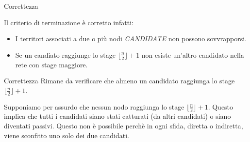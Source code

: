 \begin{frame}{Correttezza}

Il criterio di terminazione è corretto infatti:

\begin{itemize}
\setlength\itemsep{2em}
 \item I territori associati a due o più nodi \textit{CANDIDATE} non possono sovvrapporsi.
 \item Se un candiato raggiunge lo stage $\lfloor\frac{n}{2}\rfloor+1$ non esiste un'altro candidato nella rete con stage maggiore.
\end{itemize}

\end{frame}

\begin{frame}{Correttezza}
 Rimane da verificare che almeno un candidato raggiunga lo stage $\lfloor\frac{n}{2}\rfloor+1$. 

 Supponiamo per assurdo che nessun nodo raggiunga lo stage $\lfloor\frac{n}{2}\rfloor+1$.  Questo implica che tutti i candidati siano stati catturati (da altri candidati) o siano diventati passivi.
 Questo non è possibile perchè in ogni sfida, diretta o indiretta, viene sconfitto uno solo dei due candidati.
 
 
  
\end{frame}

